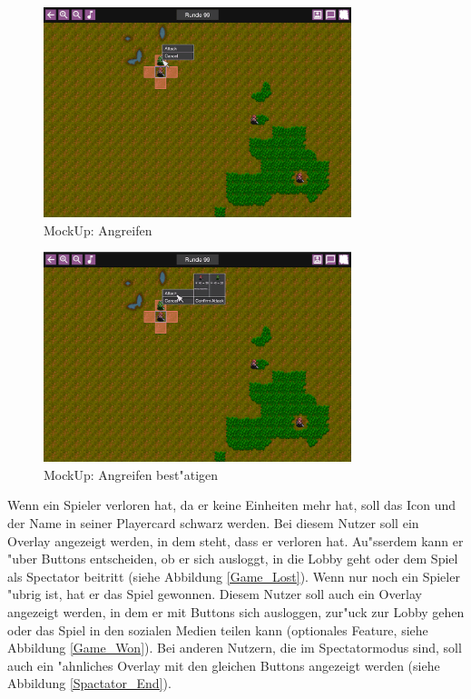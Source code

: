 \documentclass[12pt, titlepage]{scrartcl}
\newcounter{subsubsubsection}[subsubsection]
\begin{document}
			        \begin{figure}[H] 
    				    \centering
    				    \includegraphics[width=0.8\textwidth]{images/mockUps/Attack.png}
    				    \caption{MockUp: Angreifen}
    				    \label{Attack}
			        \end{figure}
			        \begin{figure}[H] 
    				    \centering
    				    \includegraphics[width=0.8\textwidth]{images/mockUps/ConfirmAttack.png}
    				    \caption{MockUp: Angreifen best"atigen}
    				    \label{Attack_Confirm}
			        \end{figure}
			        Wenn ein Spieler verloren hat, da er keine Einheiten mehr hat, soll das Icon und der Name in seiner Playercard schwarz werden. Bei diesem Nutzer soll ein Overlay angezeigt werden, in dem steht, dass er verloren hat. Au"sserdem kann er "uber Buttons entscheiden, ob er sich ausloggt, in die Lobby geht oder dem Spiel als Spectator beitritt (siehe Abbildung \ref{Game_Lost}). Wenn nur noch ein Spieler "ubrig ist, hat er das Spiel gewonnen. Diesem Nutzer soll auch ein Overlay angezeigt werden, in dem er mit Buttons sich ausloggen, zur"uck zur Lobby gehen oder das Spiel in den sozialen Medien teilen kann (optionales Feature, siehe Abbildung \ref{Game_Won}). Bei anderen Nutzern, die im Spectatormodus sind, soll auch ein "ahnliches Overlay mit den gleichen Buttons angezeigt werden (siehe Abbildung \ref{Spactator_End}).
\end{document}
